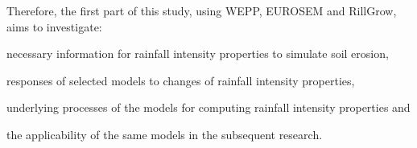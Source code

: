Therefore, the first part of this study, using WEPP, EUROSEM and RillGrow, aims
to investigate:
\begin{itemize*}
  \item necessary information for rainfall intensity properties to simulate soil
erosion,
  \item responses of selected models to changes of rainfall intensity
properties,
  \item underlying processes of the models for computing rainfall intensity
properties and
  \item the applicability of the same models in the subsequent research.
\end{itemize*}

%


